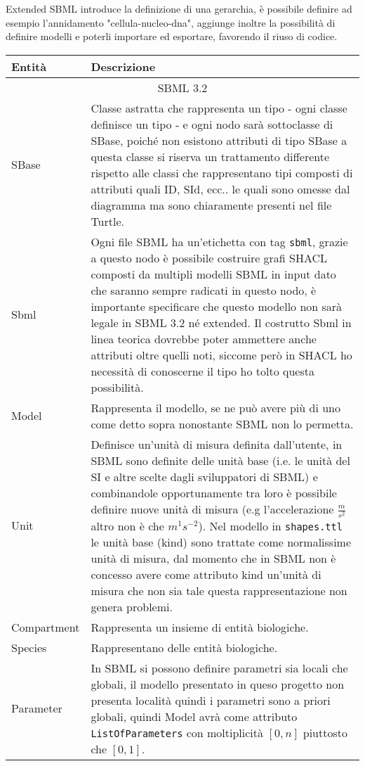 \documentclass{article}
\begin{document}
Extended SBML introduce la definizione di una gerarchia, è possibile definire ad esempio l'annidamento "cellula-nucleo-dna", aggiunge inoltre la possibilità di definire modelli e poterli importare ed esportare, favorendo il riuso di codice.

\begin{longtable}{p{}p{}}
    \textbf{Entità} & \textbf{Descrizione} \\
    \hline
    \multicolumn{2}{c}{SBML 3.2} \\
    \hline
    SBase & Classe astratta che rappresenta un tipo - ogni classe definisce un tipo - e ogni nodo sarà sottoclasse di SBase, poiché non esistono attributi di tipo SBase a questa classe si riserva un trattamento differente rispetto alle classi che rappresentano tipi composti di attributi quali ID, SId, ecc.. le quali sono omesse dal diagramma ma sono chiaramente presenti nel file Turtle. \\ 
    \hline
    Sbml & Ogni file SBML ha un'etichetta con tag \texttt{sbml}, grazie a questo nodo è possibile costruire grafi SHACL composti da multipli modelli SBML in input dato che saranno sempre radicati in questo nodo, è importante specificare che questo modello non sarà legale in SBML 3.2 né extended. Il costrutto Sbml in linea teorica dovrebbe poter ammettere anche attributi oltre quelli noti, siccome però in SHACL ho necessità di conoscerne il tipo ho tolto questa possibilità.\\
    \hline
    Model & Rappresenta il modello, se ne può avere più di uno come detto sopra nonostante SBML non lo permetta. \\
    \hline
    Unit & Definisce un'unità di misura definita dall'utente, in SBML sono definite delle unità base (i.e. le unità del SI e altre scelte dagli sviluppatori di SBML) e combinandole opportunamente tra loro è possibile definire nuove unità di misura (e.g l'accelerazione $\frac{m}{s^{2}}$ altro non è che $m^{1}s^{-2}$). Nel modello in \texttt{shapes.ttl} le unità base (kind) sono trattate come normalissime unità di misura, dal momento che in SBML non è concesso avere come attributo kind un'unità di misura che non sia tale questa rappresentazione non genera problemi. \\
    \hline 
    Compartment & Rappresenta un insieme di entità biologiche. \\
    \hline
    Species & Rappresentano delle entità biologiche. \\
    \hline
    Parameter & In SBML si possono definire parametri sia locali che globali, il modello presentato in queso progetto non presenta località quindi i parametri sono a priori globali, quindi Model avrà come attributo \texttt{ListOfParameters} con moltiplicità $[0,n]$ piuttosto che $[0,1]$. \\  

\end{longtable}
\end{document}

